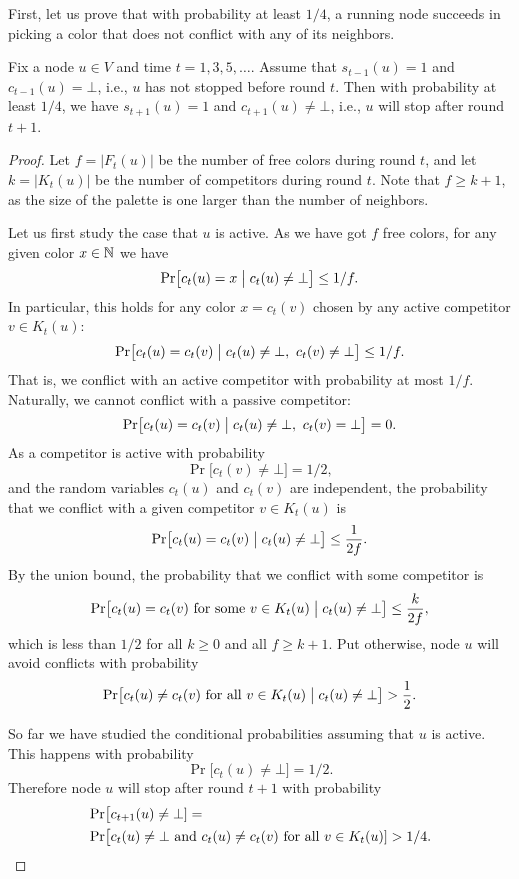First, let us prove that with probability at least $1/4$, a running node succeeds in picking a color that does not conflict with any of its neighbors.
\begin{lemma}\label{lem:bdrand-onestep}
    Fix a node $u \in V$ and time $t = 1,3,5,\dotsc$. Assume that $s_{t-1}(u) = 1$ and $c_{t-1}(u) = \bot$, i.e., $u$ has not stopped before round $t$. Then with probability at least $1/4$, we have $s_{t+1}(u) = 1$ and $c_{t+1}(u) \ne \bot$, i.e., $u$ will stop after round $t+1$.
\end{lemma}
\begin{proof}
    Let $f = |F_t(u)|$ be the number of free colors during round $t$, and let $k = |K_t(u)|$ be the number of competitors during round $t$. Note that $f \ge k + 1$, as the size of the palette is one larger than the number of neighbors.

    Let us first study the case that $u$ is active. As we have got $f$ free colors, for any given color $x \in \mathbb{N}$ we have
    \[
        \Pr\bigl[ c_t(u) = x \bigm| c_t(u) \ne \bot \bigr] \le 1/f.
    \]
    In particular, this holds for any color $x = c_t(v)$ chosen by any active competitor $v \in K_t(u)$:
    \[
        \Pr\bigl[ c_t(u) = c_t(v) \bigm| c_t(u) \ne \bot,\  c_t(v) \ne \bot \bigr] \le 1/f.
    \]
    That is, we conflict with an active competitor with probability at most $1/f$. Naturally, we cannot conflict with a passive competitor:
    \[
        \Pr\bigl[ c_t(u) = c_t(v) \bigm| c_t(u) \ne \bot,\  c_t(v) = \bot \bigr] = 0.
    \]
    As a competitor is active with probability
    \[
        \Pr\bigl[ c_t(v) \ne \bot \bigr] = 1/2,
    \]
    and the random variables $c_t(u)$ and $c_t(v)$ are independent, the probability that we conflict with a given competitor $v \in K_t(u)$ is
    \[
        \Pr\bigl[ c_t(u) = c_t(v) \bigm| c_t(u) \ne \bot \bigr] \le \frac{1}{2f}.
    \]
    By the union bound, the probability that we conflict with some competitor is
    \[
        \Pr\bigl[ c_t(u) = c_t(v) \text{ for some $v \in K_t(u)$} \bigm| c_t(u) \ne \bot \bigr] \le \frac{k}{2f},
    \]
    which is less than $1/2$ for all $k \ge 0$ and all $f \ge k+1$. Put otherwise, node $u$ will avoid conflicts with probability
    \[
        \Pr\bigl[ c_t(u) \ne c_t(v) \text{ for all $v \in K_t(u)$} \bigm| c_t(u) \ne \bot \bigr] > \frac{1}{2}.
    \]

    So far we have studied the conditional probabilities assuming that $u$ is active. This happens with probability
    \[
        \Pr\bigl[ c_t(u) \ne \bot \bigr] = 1/2.
    \]
    Therefore node $u$ will stop after round $t+1$ with probability
    \[
    \begin{split}
        &\Pr\bigl[ c_{t+1}(u) \ne \bot] = \\
        &\Pr\bigl[ c_t(u) \ne \bot \text { and } c_t(u) \ne c_t(v) \text{ for all $v \in K_t(u)$} ] > 1/4.
        \qedhere
    \end{split}
    \]
\end{proof}

